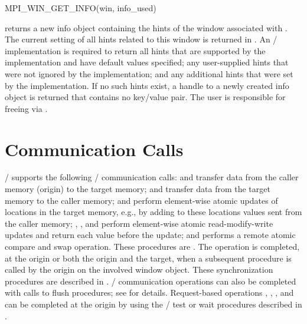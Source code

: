 %
%
\begin{funcdef}{MPI\_WIN\_GET\_INFO}{(\mbox{win}, \mbox{info\_used})}
\end{funcdef}

 returns a new info object containing
the hints of the window associated with .
The current setting of all hints related to this window is returned in
.  An \MPI/ implementation is required to return all hints
that are supported by the implementation and have default values
specified; any user-supplied hints that were not ignored by the
implementation; and any additional hints that were set by the
implementation.
If no such hints exist, a handle to a newly created info object is returned that contains no key/value pair.
The user is responsible for freeing  via .

\section{Communication Calls}
\label{sec:onesided-putget}

\MPI/ supports the following \RMA/ communication calls: 
and  transfer data from the
caller memory (origin) to the target memory;
 and  transfer data from the target memory to the caller
memory;
 and  perform element-wise atomic updates of locations in the target memory,
e.g., by adding to these locations values sent from the caller
memory; , , and
 perform element-wise atomic read-modify-write updates and return each value before the update; and
 performs a remote atomic compare and swap
operation.
These procedures are .
The operation is completed, at the origin or both the origin and the target, when
a subsequent  procedure is called by the origin on
the involved window object.  These synchronization procedures are described in
.
\RMA/ communication operations can also be completed with calls to flush procedures; see
 for details. Request-based operations
, ,
, and
 can be
completed at the origin by using the \MPI/ test or wait procedures described in
.

